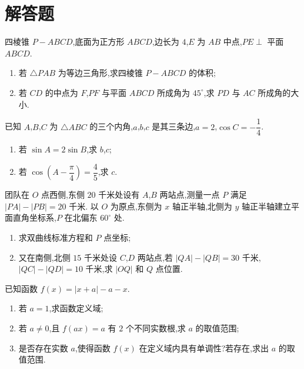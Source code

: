 \section{解答题}

\begin{problem}
四棱锥 \(P-ABCD\),底面为正方形 \(ABCD\),边长为 \(4\),\(E\) 为 \(AB\) 中点,\(PE\perp\) 平面 \(ABCD\).
\begin{enumerate}
\item 若 \(\triangle PAB\) 为等边三角形,求四棱锥 \(P-ABCD\) 的体积;
\item 若 \(CD\) 的中点为 \(F\),\(PF\) 与平面 \(ABCD\) 所成角为 \(45^\circ\),求 \(PD\) 与 \(AC\) 所成角的大小.
\end{enumerate}
\end{problem}

\begin{problem}
已知 \(A\),\(B\),\(C\) 为 \(\triangle ABC\) 的三个内角,\(a\),\(b\),\(c\) 是其三条边,\(a=2\),\(\cos C=-\dfrac14\).
\begin{enumerate}
\item 若 \(\sin A=2\sin B\),求 \(b\),\(c\);
\item 若 \(\cos\left(A-\dfrac{\pi}{4}\right)=\dfrac45\),求 \(c\).
\end{enumerate}
\end{problem}

\begin{problem}
团队在 \(O\) 点西侧,东侧 \(20\) 千米处设有 \(A\),\(B\) 两站点,测量一点 \(P\) 满足 \(|PA|-|PB|=20\) 千米. 以 \(O\) 为原点,东侧为 \(x\) 轴正半轴,北侧为 \(y\) 轴正半轴建立平面直角坐标系,\(P\) 在北偏东 \(60^\circ\) 处.
\begin{enumerate}
\item 求双曲线标准方程和 \(P\) 点坐标;
\item 又在南侧,北侧 \(15\) 千米处设 \(C\),\(D\) 两站点,若 \(|QA|-|QB|=30\) 千米,\(|QC|-|QD|=10\) 千米,求 \(|OQ|\) 和 \(Q\) 点位置.
\end{enumerate}
\end{problem}

\begin{problem}
已知函数 \(f(x)=|x+a|-a-x\).
\begin{enumerate}
\item 若 \(a=1\),求函数定义域;
\item 若 \(a\ne0\),且 \(f(ax)=a\) 有 \(2\) 个不同实数根,求 \(a\) 的取值范围;
\item 是否存在实数 \(a\),使得函数 \(f(x)\) 在定义域内具有单调性?若存在,求出 \(a\) 的取值范围.
\end{enumerate}
\end{problem}

